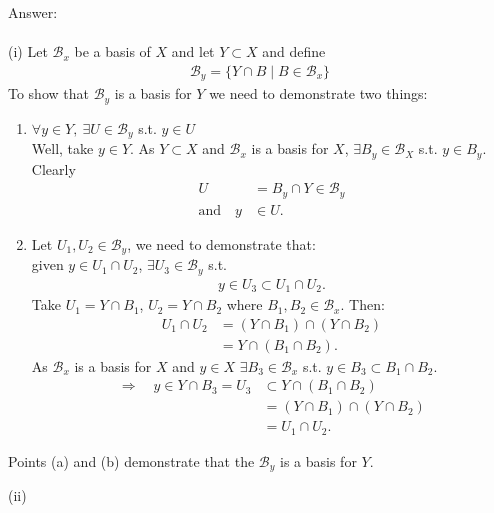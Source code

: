 \documentclass[12pt]{article}
\begin{document}
\vspace{1cm}
\noindent
Answer:\\
\\
(i) Let $\mathcal{B}_x$ be a basis of $X$ and let $Y\subset X$ and define
\begin{align*}
\mathcal{B}_y=\{Y\cap B\mid B\in\mathcal{B}_x\}
\end{align*}
To show that $\mathcal{B}_y$ is a basis for $Y$ we need to demonstrate two things:
\begin{enumerate}
\item[(a)] $\forall y\in Y,\ \exists U\in\mathcal{B}_y$ s.t. $y\in U$\\
Well, take $y\in Y$. As $Y\subset X$ and $\mathcal{B}_x$ is a basis for $X$, $\exists B_y\in\mathcal{B}_X$ s.t. $y\in B_y$.\\
Clearly
\begin{align*}
U&=B_y\cap Y\in\mathcal{B}_y\\
\text{and}\quad y&\in U.
\end{align*}
\item[(b)] Let $U_1,U_2\in\mathcal{B}_y$, we need to demonstrate that:\\
given $y\in U_1\cap U_2$, $\exists U_3\in\mathcal{B}_y$ s.t.
\begin{align*}
y\in U_3\subset U_1\cap U_2.
\end{align*}
Take $U_1=Y\cap B_1$, $U_2=Y\cap B_2$ where $B_1,B_2\in\mathcal{B}_x$. Then:
\begin{align*}
U_1\cap U_2&=(Y\cap B_1)\cap(Y\cap B_2)\\
&=Y\cap(B_1\cap B_2).
\end{align*}
As $\mathcal{B}_x$ is a basis for $X$ and $y\in X$ $\exists B_3\in\mathcal{B}_x$ s.t. $y\in B_3\subset B_1\cap B_2$.
\begin{align*}
\Rightarrow\quad y\in Y\cap B_3=U_3&\subset Y\cap(B_1\cap B_2)\\
&=(Y\cap B_1)\cap(Y\cap B_2)\\
&=U_1\cap U_2.
\end{align*}
\end{enumerate}
Points (a) and (b) demonstrate that the $\mathcal{B}_y$ is a basis for $Y$.

\newpage
\noindent
(ii)

\newpage
\end{document}
